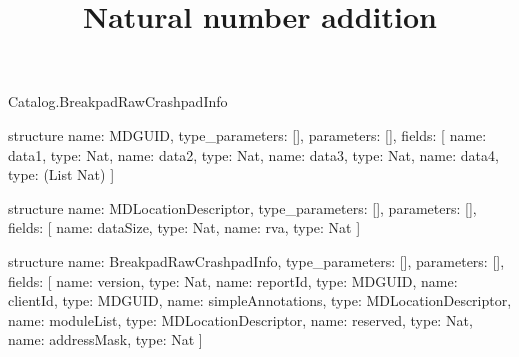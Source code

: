 \begin{lexlean}{Catalog.BreakpadRawCrashpadInfo}
\title{Natural number addition}
\begin{semanticmodule}
structure{
  name: MDGUID,
  type_parameters: [],
  parameters: [],
  fields: [
    {name: data1, type: Nat},
    {name: data2, type: Nat},
    {name: data3, type: Nat},
    {name: data4, type: (List Nat)}
  ]
}

structure{
  name: MDLocationDescriptor,
  type_parameters: [],
  parameters: [],
  fields: [
    {name: dataSize, type: Nat},
    {name: rva, type: Nat}
  ]
}

structure{
  name: BreakpadRawCrashpadInfo,
  type_parameters: [],
  parameters: [],
  fields: [
    {name: version, type: Nat},
    {name: reportId, type: MDGUID},
    {name: clientId, type: MDGUID},
    {name: simpleAnnotations, type: MDLocationDescriptor},
    {name: moduleList, type: MDLocationDescriptor},
    {name: reserved, type: Nat},
    {name: addressMask, type: Nat}
  ]
}
\end{semanticmodule}
\end{lexlean}

